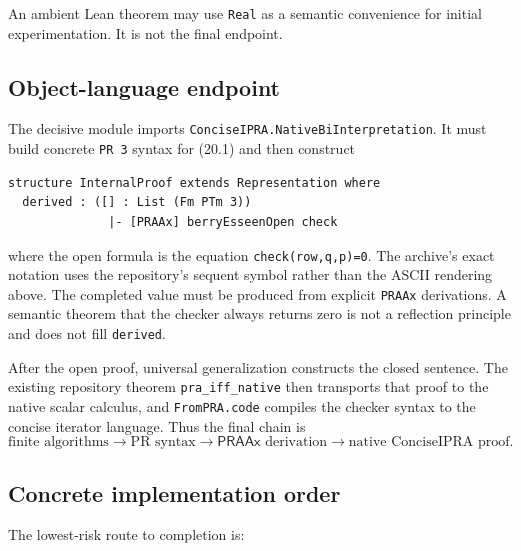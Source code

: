 \documentclass[11pt]{article}
\newcommand{\PR}{\mathrm{PR}}
\newcommand{\code}[1]{\nolinkurl{#1}}
\begin{document}
An ambient Lean theorem may use \code{Real} as a semantic convenience for
initial experimentation.  It is not the final endpoint.

\subsection{Object-language endpoint}

The decisive module imports
\code{ConciseIPRA.NativeBiInterpretation}.  It must build concrete
\code{PR 3} syntax for (20.1) and then construct
\begin{verbatim}
structure InternalProof extends Representation where
  derived : ([] : List (Fm PTm 3))
              |- [PRAAx] berryEsseenOpen check
\end{verbatim}
where the open formula is the equation
\code{check(row,q,p)=0}.  The archive's exact notation uses the repository's
sequent symbol rather than the ASCII rendering above.  The completed value
must be produced from explicit \code{PRAAx} derivations.  A semantic theorem
that the checker always returns zero is not a reflection principle and does
not fill \code{derived}.

After the open proof, universal generalization constructs the closed sentence.
The existing repository theorem \code{pra_iff_native} then transports that
proof to the native scalar calculus, and \code{FromPRA.code} compiles the
checker syntax to the concise iterator language.  Thus the final chain is
\[
 \text{finite algorithms}
 \longrightarrow \PR\text{ syntax}
 \longrightarrow \mathsf{PRAAx}\text{ derivation}
 \longrightarrow \text{native ConciseIPRA proof}.    \tag{21.1}
\]

\subsection{Concrete implementation order}

The lowest-risk route to completion is:
\end{document}
